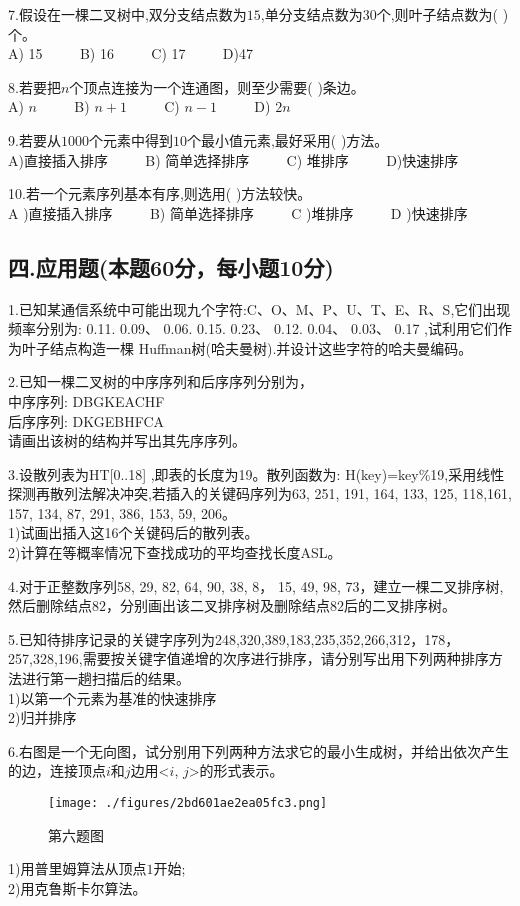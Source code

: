 7.假设在一棵二叉树中,双分支结点数为$15$,单分支结点数为$30$个,则叶子结点数为(  )个。 \\
A) 15 $\qquad$ B) 16 $\qquad$ C) 17 $\qquad$ D)47

8.若要把$n$个顶点连接为一个连通图，则至少需要(   )条边。 \\
A) $n$ $\qquad$ B) $n+1$ $\qquad$ C) $n-1$ $\qquad$ D) $2n$

9.若要从$1000$个元素中得到$10$个最小值元素,最好采用(    )方法。 \\
A)直接插入排序 $\qquad$ B) 简单选择排序 $\qquad$ C) 堆排序 $\qquad$ D)快速排序

10.若一个元素序列基本有序,则选用(  )方法较快。 \\
A )直接插入排序 $\qquad$ B) 简单选择排序 $\qquad$ C )堆排序 $\qquad$ D )快速排序

\subsection{四.应用题(本题60分，每小题10分)}

1.已知某通信系统中可能出现九个字符:C、O、M、P、U、T、E、R、S,它们出现频率分别为: 0.11. 0.09、 0.06. 0.15. 0.23、 0.12. 0.04、 0.03、 0.17 ,试利用它们作为叶子结点构造一棵 Huffman树(哈夫曼树).并设计这些字符的哈夫曼编码。

2.已知一棵二叉树的中序序列和后序序列分别为， \\
中序序列: DBGKEACHF \\
后序序列: DKGEBHFCA \\
请画出该树的结构并写出其先序序列。

3.设散列表为HT[0..18] ,即表的长度为19。散列函数为: H(key)=key\%19,采用线性探测再散列法解决冲突,若插入的关键码序列为{63, 251, 191, 164, 133, 125, 118,161, 157, 134, 87, 291, 386, 153, 59, 206}。 \\
1)试画出插入这16个关键码后的散列表。 \\
2)计算在等概率情况下查找成功的平均查找长度ASL。

4.对于正整数序列{58, 29, 82, 64, 90, 38, 8， 15, 49, 98, 73}，建立一棵二叉排序树,然后删除结点$82$，分别画出该二叉排序树及删除结点$82$后的二叉排序树。

5.已知待排序记录的关键字序列为{248,320,389,183,235,352,266,312，178，257,328,196},需要按关键字值递增的次序进行排序，请分别写出用下列两种排序方法进行第一趟扫描后的结果。 \\
1)以第一个元素为基准的快速排序 \\
2)归并排序

6.右图是一个无向图，试分别用下列两种方法求它的最小生成树，并给出依次产生的边，连接顶点$i$和$j$边用<$i$, $j$>的形式表示。
\begin{figure}[ht]
\centering
\texttt{[image: ./figures/2bd601ae2ea05fc3.png]}
\caption{第六题图} \label{fig_SMDS13_1}
\end{figure}
1)用普里姆算法从顶点$1$开始; \\
2)用克鲁斯卡尔算法。

